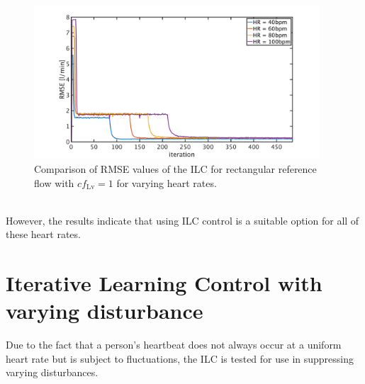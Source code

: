 \begin{figure}[ht!]
  \centering
  \includegraphics[width=0.95\textwidth]{images/chapt_5/ILC/RMSE_dist_square_const_var_hr.pdf}
  \caption[RMSE Comparison of ILC at rectangular reference flow for varying heart rates]{Comparison of RMSE values of the ILC for rectangular reference flow with $cf_{\mathrm{Lv}}=1$ for varying heart rates.}
  \label{fig:RMSE_dist_square_const_var_hr}
\end{figure}
\\However, the results indicate that using ILC control is a suitable option for all of these heart rates.
\section{Iterative Learning Control with varying disturbance}
Due to the fact that a person's heartbeat does not always occur at a uniform heart rate but is subject to fluctuations, the ILC is tested for use in suppressing varying disturbances.

